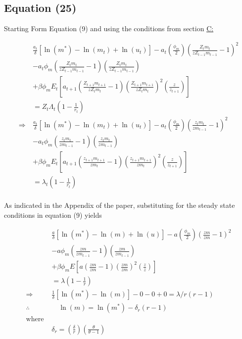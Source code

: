 \documentclass[11pt,preprint, authoryear]{elsarticle}
\numberwithin{equation}{section}
\numberwithin{figure}{section}
\numberwithin{table}{section}
\begin{document}
\hypertarget{equation-25}{%
\subsection{Equation (25)}\label{equation-25}}

Starting Form Equation (9) and using the conditions from section
\protect\hyperlink{c}{C:}

\[ \begin{aligned}
&\frac{a_{t}}{\delta}\left[\ln \left(m^{*}\right)-\ln \left(m_{t}\right)+\ln \left(u_{t}\right)\right]-a_{t}\left(\frac{\phi_{m}}{2}\right)\left(\frac{Z_t m_t }{z Z_{t-1}m_{t-1}}-1\right)^{2} \\
&-a_{t} \phi_{m}\left(\frac{Z_t m_t }{z Z_{t-1}m_{t-1}} - 1\right)\left(\frac{Z_t m_t }{z Z_{t-1}m_{t-1}}\right) \\
&+\beta \phi_{m} E_{t}\left[a_{t+1}\left(\frac{Z_{t+1} m_{t+1} }{z Z_{t}m_{t}}-1\right)\left(\frac{Z_{t+1} m_{t+1} }{z Z_{t}m_{t}}\right)^{2}\left(\frac{z }{z_{t+1}}\right)\right] \\
&=Z_{t} \Lambda_{t}\left(1-\frac{1}{r_{t}}\right)\\
\Rightarrow \ &\frac{a_{t}}{\delta}\left[\ln \left(m^{*}\right)-\ln \left(m_{t}\right)+\ln \left(u_{t}\right)\right]-a_{t}\left(\frac{\phi_{m}}{2}\right)\left(\frac{z_{t} m_{t}}{z m_{t-1}}-1\right)^{2} \\
&-a_{t} \phi_{m}\left(\frac{z_{t} m_{t}}{z m_{t-1}}-1\right)\left(\frac{z_{t} m_{t}}{z m_{t-1}}\right) \\
&+\beta \phi_{m} E_{t}\left[a_{t+1}\left(\frac{z_{t+1} m_{t+1}}{z m_{t}}-1\right)\left(\frac{z_{t+1} m_{t+1}}{z m_{t}}\right)^{2}\left(\frac{z}{z_{t+1}}\right)\right] \\
&=\lambda_{t}\left(1-\frac{1}{r_{t}}\right) \\
\end{aligned}\]

\newpage

As indicated in the Appendix of the paper, substituting for the steady
state conditions in equation (9) yields

\[\begin{aligned}
&\frac{a}{\delta}\left[\ln \left(m^{*}\right)-\ln \left(m\right)+\ln \left(u\right)\right]-a\left(\frac{\phi_{m}}{2}\right)\left(\frac{z m}{z m}-1\right)^{2} \\
&-a \phi_{m}\left(\frac{z m}{z m_{t-1}}-1\right)\left(\frac{z m}{z m_{t-1}}\right) \\
& +\beta \phi_{m} E\left[a\left(\frac{z m}{z m}-1\right)\left(\frac{z m}{z m}\right)^{2}\left(\frac{z}{z}\right)\right] \\
&=\lambda\left(1-\frac{1}{r}\right)\\
\Rightarrow &\frac{1}{\delta}\left[\ln \left(m^{*}\right)-\ln \left(m\right)\right]-0-0+0=\lambda/r\left(r-1\right)\\
\therefore &\quad \ln (m) =\ln \left(m^{*}\right)-\delta_{r}(r-1) \\
\text{where }\\
&\delta_{r} =\left(\frac{\delta}{r}\right)\left(\frac{\theta}{\theta-1}\right)
\end{aligned}\]
\end{document}
